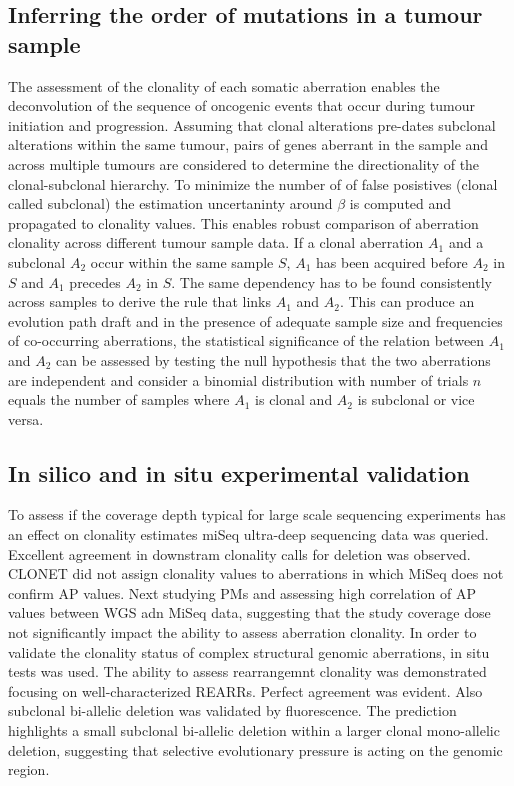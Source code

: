 	\subsection{Inferring the order of mutations in a tumour sample}
	The assessment of the clonality of each somatic aberration enables the deconvolution of the sequence of oncogenic events that occur during tumour initiation and progression.
	Assuming that clonal alterations pre-dates subclonal alterations within the same tumour, pairs of genes aberrant in the sample and across multiple tumours are considered to determine the directionality of the clonal-subclonal hierarchy.
	To minimize the number of of false posistives (clonal called subclonal) the estimation uncertaninty around $\beta$ is computed and propagated to clonality values.
	This enables robust comparison of aberration clonality across different tumour sample data.
	If a clonal aberration $A_1$ and a subclonal $A_2$ occur within the same sample $S$, $A_1$ has been acquired before $A_2$ in $S$ and $A_1$ precedes $A_2$ in $S$.
	The same dependency has to be found consistently across samples to derive the rule that links $A_1$ and $A_2$.
	This can produce an evolution path draft and in the presence of adequate sample size and frequencies of co-occurring aberrations, the statistical significance of the relation between $A_1$ and $A_2$ can be assessed by testing the null hypothesis that the two aberrations are independent and consider a binomial distribution  with number of trials $n$ equals the number of samples where $A_1$ is clonal and $A_2$ is subclonal or vice versa.

	\subsection{In silico and in situ experimental validation}
	To assess if the coverage depth typical for large scale sequencing experiments has an effect on clonality estimates miSeq ultra-deep sequencing data was queried.
	Excellent agreement in downstram clonality calls for deletion was observed.
	CLONET did not assign clonality values to aberrations in which MiSeq does not confirm AP values.
	Next studying PMs and assessing high correlation of AP values between WGS adn MiSeq data, suggesting that the study coverage dose not significantly impact the ability to assess aberration clonality.
	In order to validate the clonality status of complex structural genomic aberrations, in situ tests was used.
	The ability to assess rearrangemnt clonality was demonstrated focusing on well-characterized REARRs.
	Perfect agreement was evident.
	Also subclonal bi-allelic deletion was validated by fluorescence.
	The prediction highlights a small subclonal bi-allelic deletion within a larger clonal mono-allelic deletion, suggesting that selective evolutionary pressure is acting on the genomic region.

